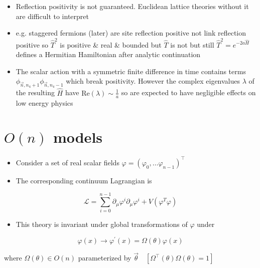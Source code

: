 \begin{itemize}
  \item Reflection positivity is not guaranteed. Euclidean lattice theories without it are difficult to interpret
  \item e.g. staggered fermions (later) are site reflection positive not link reflection positive so \(\hat{T}^{2}\) is positive \& real \& bounded but \(\hat{T}\) is not but still $\hat{T}^2 = e^{- 2 a \hat{H}}$ defines a Hermitian Hamiltonian after analytic continuation
  \item The scalar action with a symmetric finite difference in time contains terms $\phi_{\vec{n},n_4+1}\phi_{\vec{n},n_4-1}$ which break positivity. However the complex eigenvalues $\lambda$ of the resulting $\hat{H}$ have $\text{Re}(\lambda) \sim \frac{1}{a}$ so are expected to have negligible effects on low energy physics
\end{itemize}
\section{ $O(n)$ models}
\begin{itemize}
  \item Consider a set of real scalar fields \(\varphi=\left(\varphi_{0}, \ldots \varphi_{n - 1}\right)^{\top}\)
  \item The corresponding continuum Lagrangian is
\end{itemize}

\begin{equation}
\mathcal{L}=\sum_{i=0}^{n-1} \partial_{\mu} \varphi^{i} \partial_{\mu} \varphi^{i}+V\left(\varphi^{T} \varphi\right)
\end{equation}

\begin{itemize}
	\item This theory is invariant under global transformations of $\varphi$ under
\end{itemize}
\begin{equation}
\varphi(x) \rightarrow \varphi^{\prime}(x)=\Omega(\theta) \varphi(x)
\end{equation}

where \(\Omega(\theta) \in O(n)\) parameterized by \(\vec{\theta} \quad\left[\Omega^{\top}(\theta) \Omega(\theta)=1\right]\)

